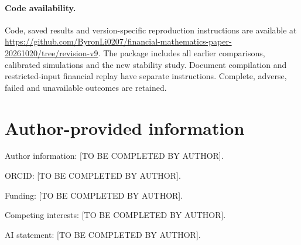 \documentclass[11pt,a4paper]{article}
\begin{document}
\paragraph{Code availability.} Code, saved results and version-specific reproduction instructions are available at \url{https://github.com/ByronLi0207/financial-mathematics-paper-20261020/tree/revision-v9}. The package includes all earlier comparisons, calibrated simulations and the new stability study. Document compilation and restricted-input financial replay have separate instructions. Complete, adverse, failed and unavailable outcomes are retained.

\section*{Author-provided information}
Author information: [TO BE COMPLETED BY AUTHOR].\par
ORCID: [TO BE COMPLETED BY AUTHOR].\par
Funding: [TO BE COMPLETED BY AUTHOR].\par
Competing interests: [TO BE COMPLETED BY AUTHOR].\par
AI statement: [TO BE COMPLETED BY AUTHOR].
\end{document}
